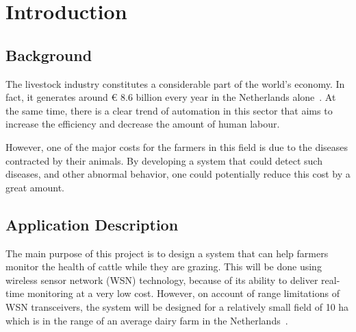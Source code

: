 \documentclass[conference]{IEEEtran}
\begin{document}




\maketitle

%
\IEEEpeerreviewmaketitle


\section{Introduction}

\subsection{Background}

The livestock industry constitutes a considerable part of the world’s economy.
In fact, it generates around \euro{} 8.6 billion every year in the Netherlands
alone~\cite{nedgov}. At the same time, there is a clear trend of automation in
this sector that aims to increase the efficiency and decrease the amount of
human labour.

However, one of the major costs for the farmers in this field is due to the
diseases contracted by their animals. By developing a system that could detect
such diseases, and other abnormal behavior, one could potentially reduce this
cost by a great amount.  


\subsection{Application Description}

The main purpose of this project is to design a system that can help farmers
monitor the health of cattle while they are grazing. This will be done using
wireless sensor network (WSN) technology, because of its ability to deliver
real-time monitoring at a very low cost.  However, on account of range
limitations of WSN transceivers, the system will be designed for a relatively
small field of 10 ha which is in the range of an average dairy farm in the
Netherlands~\cite{agriculturalsystems}.
\end{document}
